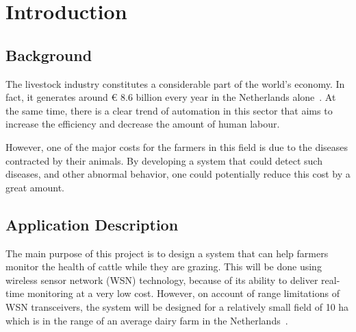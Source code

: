 \documentclass[conference]{IEEEtran}
\begin{document}




\maketitle

%
\IEEEpeerreviewmaketitle


\section{Introduction}

\subsection{Background}

The livestock industry constitutes a considerable part of the world’s economy.
In fact, it generates around \euro{} 8.6 billion every year in the Netherlands
alone~\cite{nedgov}. At the same time, there is a clear trend of automation in
this sector that aims to increase the efficiency and decrease the amount of
human labour.

However, one of the major costs for the farmers in this field is due to the
diseases contracted by their animals. By developing a system that could detect
such diseases, and other abnormal behavior, one could potentially reduce this
cost by a great amount.  


\subsection{Application Description}

The main purpose of this project is to design a system that can help farmers
monitor the health of cattle while they are grazing. This will be done using
wireless sensor network (WSN) technology, because of its ability to deliver
real-time monitoring at a very low cost.  However, on account of range
limitations of WSN transceivers, the system will be designed for a relatively
small field of 10 ha which is in the range of an average dairy farm in the
Netherlands~\cite{agriculturalsystems}.
\end{document}
